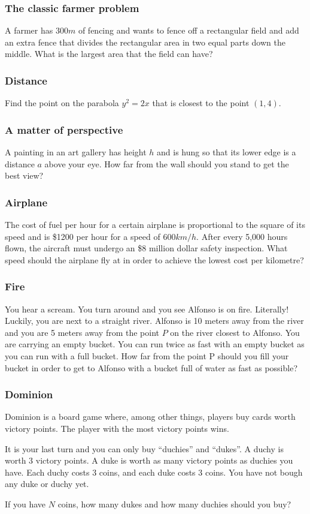 \begin{frame}[t]
	\frametitle{The classic farmer problem}

	A farmer has $300m$ of fencing and wants to fence off a rectangular field and
	add an extra fence that divides the rectangular area in two equal parts down
	the middle. What is the largest area that the field can have?
\end{frame}

\begin{frame}[t]
	\frametitle{Distance}

	Find the point on the parabola $y^{2}=2x$ that is closest to the point $(1,4)$.
\end{frame}

\begin{frame}[t]
	\frametitle{A matter of perspective}

	A painting in an art gallery has height $h$ and is hung so that its lower edge
	is a distance $a$ above your eye. How far from the wall should you stand to get
	the best view?
\end{frame}

\begin{frame}[t]
	\frametitle{Airplane}

	The cost of fuel per hour for a certain airplane is proportional to the square
	of its speed and is \$1200 per hour for a speed of 600$km/h$. After every 5,000
	hours flown, the aircraft must undergo an \$8 million dollar safety inspection.
	What speed should the airplane fly at in order to achieve the lowest cost per
	kilometre?
\end{frame}

\begin{frame}[t]
	\frametitle{Fire}

	You hear a scream. You turn around and you see Alfonso is on fire. Literally! Luckily,
	you are next to a straight river. Alfonso is 10 meters away from the river and
	you are 5 meters away from the point $P$ on the river closest to Alfonso. You
	are carrying an empty bucket. You can run twice as fast with an empty bucket as
	you can run with a full bucket. How far from the point P should you fill your
	bucket in order to get to Alfonso with a bucket full of water as fast as
	possible?

\end{frame}

\begin{frame}[t]
	\frametitle{Dominion}

	Dominion is a board game where, among other things, players buy cards worth
	victory points. The player with the most victory points wins.

	It is your last turn and you can only buy ``duchies'' and ``dukes''. A duchy
	is worth 3 victory points. A duke is worth as many victory points as duchies you
	have. Each duchy costs 3 coins, and each duke costs 3 coins. You have not
	bough any duke or duchy yet.

	If you have $N$ coins, how many dukes and how many duchies should you buy?
\end{frame}

